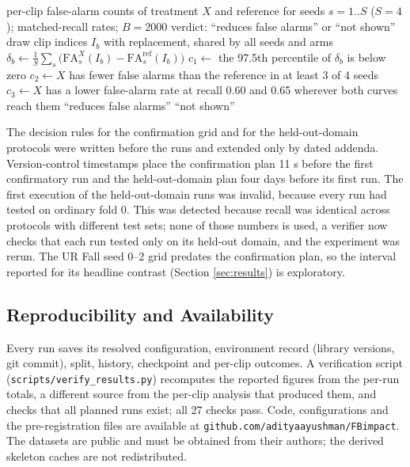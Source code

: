 \documentclass[journal]{IEEEtran}
\begin{document}
\begin{algorithm*}[!t]
\caption{Paired bootstrap and the pre-registered decision rule for ``reduces false alarms''.}
\label{alg:boot}
\begin{algorithmic}[1]
\REQUIRE per-clip false-alarm counts of treatment $X$ and reference for seeds $s=1..S$ ($S=4$); matched-recall rates; $B=2000$
\ENSURE verdict: ``reduces false alarms'' or ``not shown''
\STATE draw clip indices $I_b$ with replacement, shared by all seeds and arms
\STATE $\delta_b \leftarrow \frac{1}{S}\sum_s \big(\mathrm{FA}^{X}_s(I_b) - \mathrm{FA}^{\mathrm{ref}}_s(I_b)\big)$
\ENDFOR
\STATE $c_1 \leftarrow$ the 97.5th percentile of $\delta_b$ is below zero
\STATE $c_2 \leftarrow X$ has fewer false alarms than the reference in at least 3 of 4 seeds
\STATE $c_3 \leftarrow X$ has a lower false-alarm rate at recall 0.60 and 0.65 wherever both curves reach them
\RETURN ``reduces false alarms''
\ENDIF
\RETURN ``not shown''
\end{algorithmic}
\end{algorithm*}


The decision rules for the confirmation grid and for the held-out-domain protocols were written before the runs and extended only by dated addenda. Version-control timestamps place the confirmation plan 11 s before the first confirmatory run and the held-out-domain plan four days before its first run. The first execution of the held-out-domain runs was invalid, because every run had tested on ordinary fold 0. This was detected because recall was identical across protocols with different test sets; none of those numbers is used, a verifier now checks that each run tested only on its held-out domain, and the experiment was rerun. The UR Fall seed 0--2 grid predates the confirmation plan, so the interval reported for its headline contrast (Section \ref{sec:results}) is exploratory.


\subsection{Reproducibility and Availability}\label{sub:repro}

Every run saves its resolved configuration, environment record (library versions, git commit), split, history, checkpoint and per-clip outcomes. A verification script (\texttt{scripts/verify\_results.py}) recomputes the reported figures from the per-run totals, a different source from the per-clip analysis that produced them, and checks that all planned runs exist; all 27 checks pass. Code, configurations and the pre-registration files are available at \texttt{github.com/adityaayushman/FBimpact}. The datasets are public and must be obtained from their authors; the derived skeleton caches are not redistributed.
\end{document}

